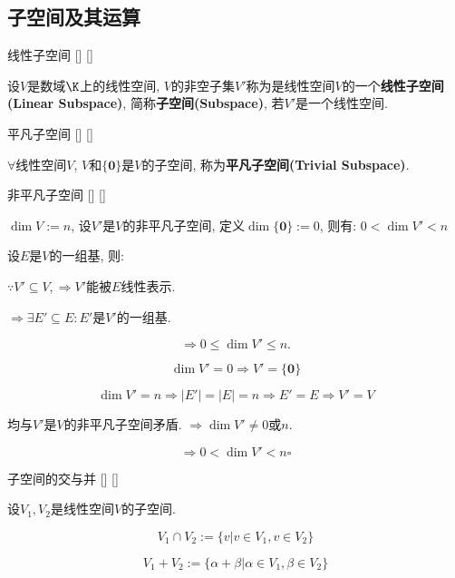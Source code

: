 \documentclass[UTF8]{ctexart}
\begin{document}
	\subsection{子空间及其运算}
		
		\begin{dfn}
			[]
			{线性子空间}
			[]
			[]

			设$V$是数域$\K$上的线性空间, $V$的非空子集$V'$称为是线性空间$V$的一个\textbf{线性子空间(Linear Subspace)}, 简称\textbf{子空间(Subspace)}, 若$V'$是一个线性空间. 
		\end{dfn}
		
		\begin{ppt}
			[]
			{平凡子空间}
			[]
			[]

			$\forall$线性空间$V$, $V$和$\{\mathbf{0}\}$是$V$的子空间, 称为\textbf{平凡子空间(Trivial Subspace)}. 
		\end{ppt}
		
		\begin{ppt}
			[]
			{非平凡子空间}
			[]
			[]

			$\dim V:=n$, 设$V'$是$V$的非平凡子空间, 定义$\dim \{\mathbf{0}\}:=0$, 则有: $0<\dim V'<n$
		\end{ppt}
  
		\begin{prf}
		
			设$E$是$V$的一组基, 则: 
			
			$\because V'\subseteq V, \Longrightarrow V'$能被$E$线性表示. 
			
			$\Longrightarrow \exists E'\subseteq E: E'$是$V'$的一组基. 
			
			$$\Longrightarrow 0\leq \dim V' \leq n.$$
			
			$$\dim V'=0\Longrightarrow V'=\{\mathbf{0}\}$$
			
			$$\dim V'=n\Longrightarrow |E'|=|E|=n\Longrightarrow E'=E\Longrightarrow V'=V$$
			
			均与$V'$是$V$的非平凡子空间矛盾. $\Longrightarrow \dim V'\neq 0$或$n$. 
			
			$$\Longrightarrow 0<\dim V'<n\square$$
		\end{prf}
  
		\begin{dfn}
			[]
			{子空间的交与并}
			[]
			[]

			设$V_{1},V_{2}$是线性空间$V$的子空间. 
			
			$$V_{1}\cap V_{2}:=\{v|v\in V_{1},v\in V_{2}\}$$
			
			$$V_{1}+V_{2}:=\{\alpha+\beta|\alpha\in V_{1}, \beta\in V_{2}\}$$
		\end{dfn}
		
\end{document}
